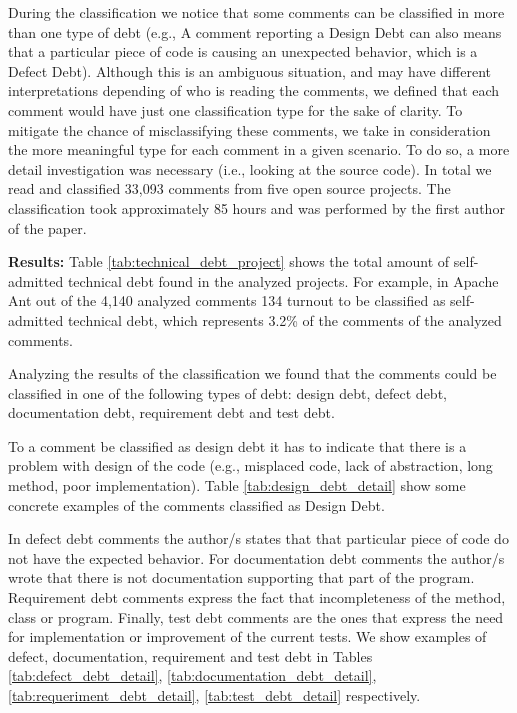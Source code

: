 During the classification we notice that some comments can be classified in more than one type of debt (e.g., A comment reporting a Design Debt can also means that a particular piece of code is causing an unexpected behavior, which is a Defect Debt). Although this is an ambiguous situation, and may have different interpretations depending of who is reading the comments, we defined that each comment would have just one classification type for the sake of clarity. To mitigate the chance of misclassifying these comments, we take in consideration the more meaningful type for each comment in a given scenario. To do so, a more detail investigation was necessary (i.e., looking at the source code). In total we read and classified 33,093 comments from five open source projects. The classification took approximately 85 hours and was performed by the first author of the paper. 

\vspace{1mm}
\noindent\textbf{Results:} Table \ref{tab:technical_debt_project} shows the total amount of self-admitted technical debt found in the analyzed projects. For example, in Apache Ant out of the 4,140 analyzed comments 134 turnout to be classified as self-admitted technical debt, which represents 3.2\% of the comments of the analyzed comments. 

Analyzing the results of the classification we found that the comments could be classified in one of the following types of debt: design debt, defect debt, documentation debt, requirement debt and  test debt. 
 
To a comment be classified as design debt it has to indicate that there is a problem with design of the code (e.g., misplaced code, lack of abstraction, long method, poor implementation). Table \ref{tab:design_debt_detail} show some concrete examples of the comments classified as Design Debt. 

In defect debt comments the author/s states that that particular piece of code do not have the expected behavior. For documentation debt comments the author/s wrote that there is not documentation supporting that part of the program. Requirement debt comments express the fact that incompleteness of the method, class or program. Finally, test debt comments are the ones that express the need for implementation or improvement of the current tests. We show examples of defect, documentation, requirement and test debt in Tables \ref{tab:defect_debt_detail}, \ref{tab:documentation_debt_detail}, \ref{tab:requeriment_debt_detail}, \ref{tab:test_debt_detail} respectively.   

